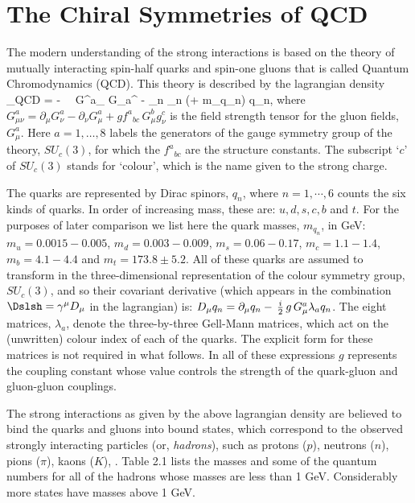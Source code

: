 \documentclass[12pt]{report}
\begin{document}
\section{The Chiral Symmetries of QCD}

The modern understanding of the strong interactions is
based on the theory of mutually interacting spin-half
quarks and spin-one gluons that is called Quantum
Chromodynamics (QCD). This theory is described by the
lagrangian density 
%
\eq
\label{qcdlagr}
\Scl_{\sss QCD} = - \,  \, G^a_{\mu\nu} 
G_a^{\mu\nu} - \sum_n \qbr_n
(\Dslsh + m_{q_n}) q_n,
\eeq
%
where $G^a_{\mu\nu} = \partial_\mu G^a_\nu - \partial_\nu 
G^a_\mu + g {f^a}_{bc} \, G^b_\mu g^c_\nu$ is the field
strength tensor for the gluon fields, $G^a_\mu$. Here 
$a=1,\dots,8$ labels the generators of the gauge symmetry
group of the theory, $SU_c(3)$, for which the ${f^a}_{bc}$
are the structure constants. The subscript `$c$' of
$SU_c(3)$ stands for `colour', which is the name given to
the strong charge.

The quarks are represented by Dirac spinors, $q_n$, where
$n=1,\cdots,6$ counts the six kinds of quarks. In order of
increasing mass, these are: $u,d,s,c,b$ and $t$. For the
purposes of later comparison we list here the quark masses,
$m_{q_n}$, in GeV: $m_u = 0.0015 - 0.005$, 
$m_d = 0.003 - 0.009$, $m_s = 0.06 - 0.17$,
$m_c = 1.1 - 1.4$, $m_b = 4.1 - 4.4$ and 
$m_t = 173.8 \pm 5.2$. All of these
quarks are assumed to transform in the three-dimensional
representation of the colour symmetry group, $SU_c(3)$, and
so their covariant derivative (which appears in the
combination $\Dslsh = \gamma^\mu 
D_\mu$ in the lagrangian) is: $D_\mu q_n = \partial_\mu q_n
-\, {i\over 2}\, g\, G^a_\mu \lambda_a q_n$. The eight matrices,
$\lambda_a$, denote the three-by-three Gell-Mann matrices,
which act on the (unwritten) colour index of each of the
quarks. The explicit form for these matrices is not
required in what follows. In all of these expressions $g$
represents the coupling constant whose value controls the
strength of the quark-gluon and gluon-gluon couplings.

The strong interactions as given by the above lagrangian
density are believed to bind the quarks and gluons into
bound states, which correspond to the observed strongly
interacting particles (or, {\em hadrons}), such as protons
($p$), neutrons ($n$), pions 
($\pi$), kaons ($K$), \etc. Table 2.1 lists the masses and
some of the quantum numbers for all of the hadrons whose
masses are less than 1 GeV. Considerably more states have
masses above 1 GeV.
\end{document}
